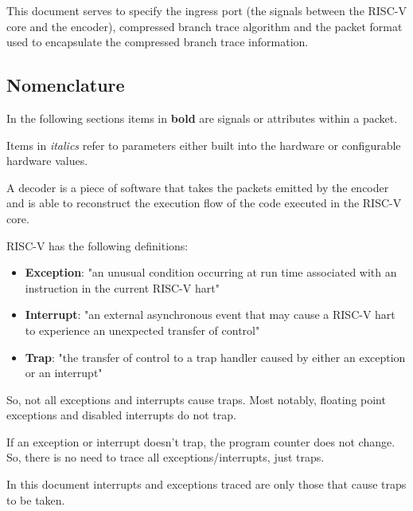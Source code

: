 This document serves to specify the ingress port (the signals between
the RISC-V core and the encoder), compressed branch trace algorithm and
the packet format used to encapsulate the compressed branch trace
information.

\subsection{Nomenclature}

In the following sections items in \textbf{bold} are signals or
attributes within a packet.

Items in \textit {italics} refer to parameters either built into the
hardware or configurable hardware values.

A decoder is a piece of software that takes the packets emitted by the
encoder and is able to reconstruct the execution flow of the code
executed in the RISC-V core.

RISC-V has the following definitions:
\begin{itemize}
  \item
    \textbf{Exception}: "an unusual condition occurring at run time associated with an instruction in the current RISC-V hart"
  \item
    \textbf{Interrupt}: "an external asynchronous event that may cause a RISC-V hart to experience an unexpected transfer of control"
  \item
    \textbf{Trap}: "the transfer of control to a trap handler caused by either an exception or an interrupt"
\end{itemize}
So, not all exceptions and interrupts cause traps. Most notably, floating point exceptions and disabled interrupts do not trap.

If an exception or interrupt doesn't trap, the program counter does not
change. So, there is no need to trace all exceptions/interrupts, just
traps.

In this document interrupts and exceptions traced are only those that cause traps to be taken.
